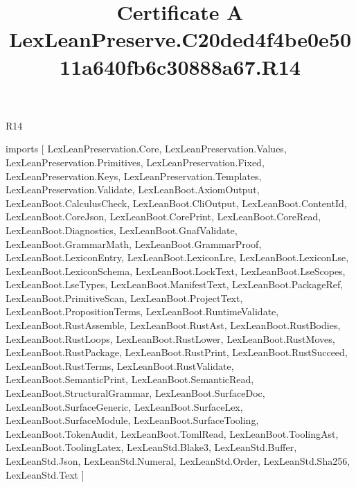 \begin{lexlean}{R14}
\title{Certificate A LexLeanPreserve.C20ded4f4be0e5011a640fb6c30888a67.R14}
\begin{coremodule}
imports [
  LexLeanPreservation.Core,
  LexLeanPreservation.Values,
  LexLeanPreservation.Primitives,
  LexLeanPreservation.Fixed,
  LexLeanPreservation.Keys,
  LexLeanPreservation.Templates,
  LexLeanPreservation.Validate,
  LexLeanBoot.AxiomOutput,
  LexLeanBoot.CalculusCheck,
  LexLeanBoot.CliOutput,
  LexLeanBoot.ContentId,
  LexLeanBoot.CoreJson,
  LexLeanBoot.CorePrint,
  LexLeanBoot.CoreRead,
  LexLeanBoot.Diagnostics,
  LexLeanBoot.GnafValidate,
  LexLeanBoot.GrammarMath,
  LexLeanBoot.GrammarProof,
  LexLeanBoot.LexiconEntry,
  LexLeanBoot.LexiconLre,
  LexLeanBoot.LexiconLse,
  LexLeanBoot.LexiconSchema,
  LexLeanBoot.LockText,
  LexLeanBoot.LseScopes,
  LexLeanBoot.LseTypes,
  LexLeanBoot.ManifestText,
  LexLeanBoot.PackageRef,
  LexLeanBoot.PrimitiveScan,
  LexLeanBoot.ProjectText,
  LexLeanBoot.PropositionTerms,
  LexLeanBoot.RuntimeValidate,
  LexLeanBoot.RustAssemble,
  LexLeanBoot.RustAst,
  LexLeanBoot.RustBodies,
  LexLeanBoot.RustLoops,
  LexLeanBoot.RustLower,
  LexLeanBoot.RustMoves,
  LexLeanBoot.RustPackage,
  LexLeanBoot.RustPrint,
  LexLeanBoot.RustSucceed,
  LexLeanBoot.RustTerms,
  LexLeanBoot.RustValidate,
  LexLeanBoot.SemanticPrint,
  LexLeanBoot.SemanticRead,
  LexLeanBoot.StructuralGrammar,
  LexLeanBoot.SurfaceDoc,
  LexLeanBoot.SurfaceGeneric,
  LexLeanBoot.SurfaceLex,
  LexLeanBoot.SurfaceModule,
  LexLeanBoot.SurfaceTooling,
  LexLeanBoot.TokenAudit,
  LexLeanBoot.TomlRead,
  LexLeanBoot.ToolingAst,
  LexLeanBoot.ToolingLatex,
  LexLeanStd.Blake3,
  LexLeanStd.Buffer,
  LexLeanStd.Json,
  LexLeanStd.Numeral,
  LexLeanStd.Order,
  LexLeanStd.Sha256,
  LexLeanStd.Text
]


\end{coremodule}
\end{lexlean}
